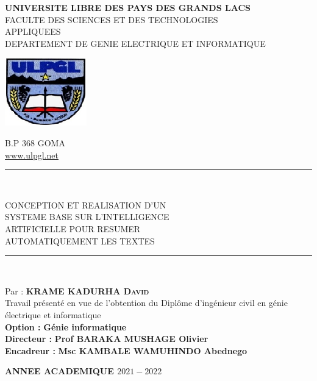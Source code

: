 \begin{center}
\textsc{\Large \textbf{UNIVERSITE LIBRE DES PAYS DES GRANDS LACS}}\\[0.2cm]
\textsc{\Large FACULTE DES SCIENCES ET DES TECHNOLOGIES}\\[0.2cm]
\textsc{\Large APPLIQUEES}\\[0.4cm]
\textsc{DEPARTEMENT DE GENIE ELECTRIQUE ET INFORMATIQUE}\\
\begin{center}
\includegraphics[scale=0.7]{LogoUL.png}
\end{center}
\textsc{\Large B.P $ 368 $ GOMA}\\
\href{http://www.ulpgl.net}{\underline{www.ulpgl.net}}\\
\vspace{2pt}
\begin{center}
{\color{black}\rule{1.0\textwidth}{2pt}}\\[0.2cm]
\begin{center}
\textsc{\LARGE CONCEPTION ET REALISATION D'UN}\\[0.1cm]
\textsc{\LARGE SYSTEME BASE SUR L'INTELLIGENCE}\\[0.1cm]
\textsc{\LARGE ARTIFICIELLE POUR RESUMER}\\[0.1cm]
\textsc{\LARGE AUTOMATIQUEMENT LES TEXTES}
\end{center}
{\color{black}\rule{1.0\textwidth}{2pt}}\\[0.2cm]
\end{center}
\vspace{3pt}
\hspace*{5cm}\begin{minipage}{0.7 \textwidth}
\begin{flushleft}\large
Par : \textbf{\textsc{KRAME KADURHA David}}\\
Travail présenté en vue de l'obtention du Diplôme d'ingénieur civil en génie électrique et informatique\\
\vspace{2pt}
\textbf{Option :} \textbf{Génie informatique}\\
\vspace{2pt}
\textbf{Directeur :} \textbf{Prof BARAKA MUSHAGE Olivier}\\
\vspace{2pt}
\textbf{Encadreur :} \textbf{Msc KAMBALE WAMUHINDO Abednego}
\end{flushleft}
\end{minipage}
\hrulefill
\begin{center}
\vspace{13pt}
\textbf{\Large ANNEE ACADEMIQUE   $ 2021-2022 $}
\end{center}
\end{center}
